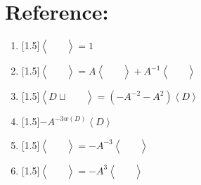 \documentclass[14pt]{extarticle}
\newcommand{\LP}{\left(}
\newcommand{\RP}{\right)}
\newcommand{\LA}{\left\langle}
\newcommand{\RA}{\right\rangle}
\newcommand{\img}[1]{\begin{aligned}
    &\ \\
    &\\
    &\
\end{aligned}}
\begin{document}
\section*{Reference:}
\begin{enumerate}
        \item{ \scalebox{1.5}[1.5]{${\LA \img{unknot.svg} \RA=1}$}\vspace{-2cm}}
        \item{ \scalebox{1.5}[1.5]{$\LA \img{crossing_un.svg}\RA=A\LA \img{6a.svg} \RA+A^{-1}\LA\img{6b.svg}\RA$}\vspace{-2cm}}
        \item{ \scalebox{1.5}[1.5]{${\LA D \sqcup \img{unknot.svg} \RA=\LP-A^{-2}-A^2\RP\LA D\RA}$}\vspace{-1cm}}
        \item{ \scalebox{1.5}[1.5]{$-A^{-3w\LP D\RP}\LA D\RA$}\vspace{-.5cm}}
        \item{ \scalebox{1.5}[1.5]{$\LA\img{t1.svg}\RA=-A^{-3}\LA\img{t1_2.svg}\RA$}\vspace{-2cm}}
        \item{ \scalebox{1.5}[1.5]{$\LA\img{t1_l.svg}\RA=-A^{3}\LA\img{t1_2.svg}\RA$}}
\end{enumerate}
\end{document}
